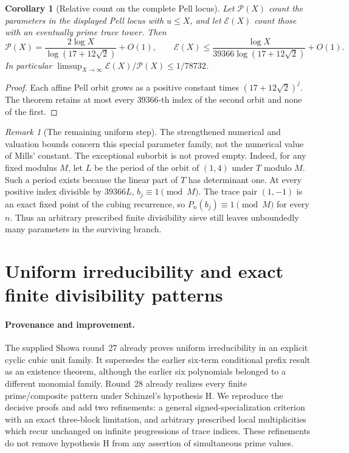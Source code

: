 \documentclass[11pt,a4paper]{article}
\newtheorem{corollary}[theorem]{Corollary}
\theoremstyle{definition}\newtheorem{definition}[theorem]{Definition}
\theoremstyle{remark}\newtheorem{remark}[theorem]{Remark}
\begin{document}
\begin{corollary}[Relative count on the complete Pell locus]
Let $\mathcal P(X)$ count the parameters in the displayed Pell locus
with $u\le X$, and let $\mathcal E(X)$ count those with an eventually
prime trace tower. Then
\[
 \mathcal P(X)=\frac{2\log X}{\log(17+12\sqrt2)}+O(1),\qquad
 \mathcal E(X)\le
 \frac{\log X}{39366\log(17+12\sqrt2)}+O(1).
\]
In particular $\limsup_{X\to\infty}\mathcal E(X)/\mathcal P(X)
\le1/78732$.
\end{corollary}
\begin{proof}
Each affine Pell orbit grows as a positive constant times
$(17+12\sqrt2)^j$. The theorem retains at most every $39366$-th
index of the second orbit and none of the first.
\end{proof}

\begin{remark}[The remaining uniform step]
The strengthened numerical and valuation bounds concern this special
parameter family, not the numerical value of Mills' constant.
The exceptional suborbit is not proved empty. Indeed, for any fixed
modulus $M$, let $L$ be the period of the orbit of $(1,4)$ under $T$
modulo $M$. Such a period exists because the linear part of $T$ has
determinant one. At every positive index divisible by $39366L$,
$b_j\equiv1\pmod M$. The trace pair $(1,-1)$ is an exact fixed point
of the cubing recurrence, so $P_n(b_j)\equiv1\pmod M$ for every $n$.
Thus an arbitrary prescribed finite divisibility sieve still leaves
unboundedly many parameters in the surviving branch.
\end{remark}

\section{Uniform irreducibility and exact finite divisibility patterns}
\label{pis:sec:factor-patterns}

\paragraph{Provenance and improvement.}
The supplied Showa round~27 already proves uniform irreducibility in
an explicit cyclic cubic unit family. It supersedes the earlier
six-term conditional prefix result as an existence theorem, although
the earlier six polynomials belonged to a different monomial family.
Round~28 already realizes every finite prime/composite pattern under
Schinzel's hypothesis H. We reproduce the decisive proofs and add two
refinements: a general signed-specialization criterion with an exact
three-block limitation, and arbitrary prescribed local multiplicities
which recur unchanged on infinite progressions of trace indices.
These refinements do not remove hypothesis H from any assertion of
simultaneous prime values.
\end{document}
